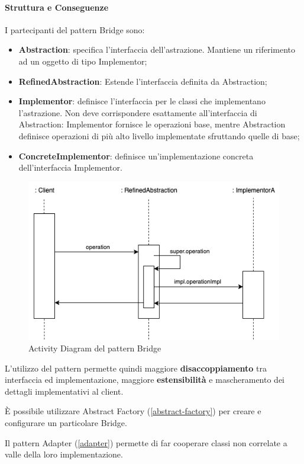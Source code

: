 \paragraph{Struttura e Conseguenze} I partecipanti del pattern Bridge sono:
\begin{itemize}
    \item \textbf{Abstraction}: specifica l’interfaccia dell’astrazione. Mantiene un riferimento ad un oggetto di tipo Implementor;
    \item \textbf{RefinedAbstraction}: Estende l’interfaccia definita da Abstraction;
    \item \textbf{Implementor}: definisce l’interfaccia per le classi che implementano l’astrazione. Non deve corrispondere esattamente all’interfaccia di Abstraction: Implementor fornisce le operazioni base, mentre Abstraction definisce operazioni di più alto livello implementate sfruttando quelle di base;
    \item \textbf{ConcreteImplementor}: definisce un’implementazione concreta dell’interfaccia Implementor.
\end{itemize}

\begin{figure}[H]
    \centering
    \includegraphics[width=1\linewidth]{assets/pattern/bridge/bridge-activity.drawio.png}
    \caption{Activity Diagram del pattern Bridge}
\end{figure}

L'utilizzo del pattern permette quindi maggiore \textbf{disaccoppiamento} tra interfaccia ed implementazione, maggiore \textbf{estensibilità} e mascheramento dei dettagli implementativi al client.

È possibile utilizzare Abstract Factory (\ref{abstract-factory}) per creare e configurare un particolare Bridge.

Il pattern Adapter (\ref{adapter}) permette di far cooperare classi non correlate a valle della loro implementazione.



\newpage